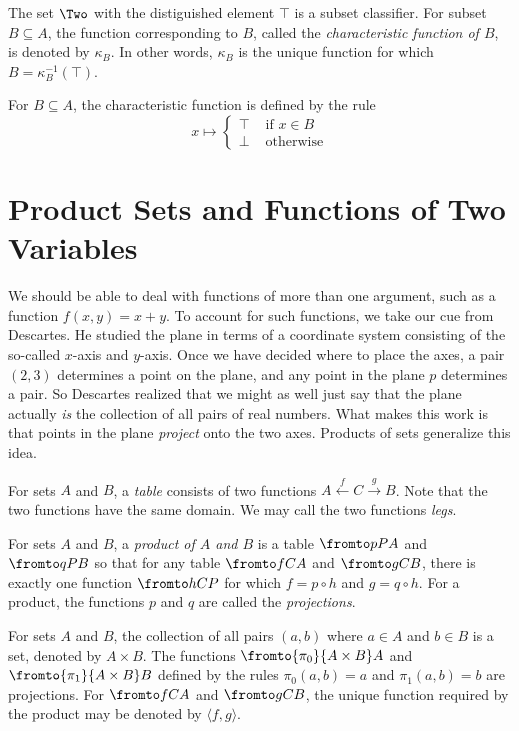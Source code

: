 \begin{axiom}
	The set $\Two$ with the distiguished element $\top$ is a subset classifier.
	For subset $B\subseteq A$, the function corresponding to $B$, called the \emph{characteristic function of $B$}, is denoted by $\kappa_B$.
	In other words, $\kappa_B$ is the unique function for which $B = \kappa_B^{-1}(\top)$.
\end{axiom}

For $B\subseteq A$, the characteristic function is defined by the rule
\[
x \mapsto
	\begin{cases}
		\top &\text{ if } x\in B\\
		\bot &\text{ otherwise}
	\end{cases}
\]

\section{Product Sets and Functions of Two Variables}

We should be able to deal with functions of more than one argument, such as a function $f(x,y) = x+y$.
To account for such functions, we take our cue from Descartes.
He studied the plane in terms of a coordinate system consisting of the so-called $x$-axis and $y$-axis.
Once we have decided where to place the axes, a pair $(2,3)$ determines a point on the plane, and any point in the plane $p$ determines a pair.
So Descartes realized that we might as well just say that the plane actually \emph{is} the collection of all pairs of real numbers.
What makes this work is that points in the plane \emph{project} onto the two axes.
Products of sets generalize this idea.

\begin{defn}
For sets $A$ and $B$, a \emph{table} consists of two functions $A\stackrel{f}{\longleftarrow} C\stackrel{g}{\longrightarrow}B$.
Note that the two functions have the same domain. We may call the two functions \emph{legs}.

For sets $A$ and $B$, a \emph{product of $A$ and $B$} is a table $\fromto pPA$ and $\fromto qPB$ so that for any table $\fromto fCA$ and $\fromto gCB$, there is exactly one function $\fromto hCP$ for which $f = p\circ h$ and $g= q\circ h$. 
For a product, the functions $p$ and $q$ are called the \emph{projections}.
\end{defn}

\begin{axiom}
	For sets $A$ and $B$, the collection of all pairs $(a,b)$ where $a\in A$ and $b\in B$ is a set, denoted by $A\times B$. 
	The functions $\fromto {\pi_0}{A\times B}A$ and $\fromto {\pi_1}{A\times B}B$ defined by the rules $\pi_0(a,b)=a$
	and $\pi_1(a,b)=b$ are projections. For $\fromto fCA$ and $\fromto gCB$, the unique function required by
	the product may be denoted by $\langle f,g\rangle$.
\end{axiom}

